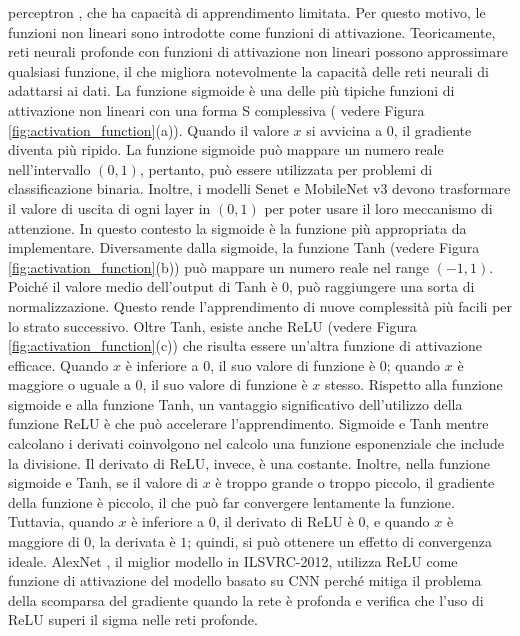 perceptron \cite{rosenblatt1958perceptron, rosenblatt1961principles}, che ha capacità di apprendimento limitata. 
Per questo motivo, le funzioni non lineari sono introdotte come funzioni di attivazione. Teoricamente, reti 
neurali profonde con funzioni di attivazione non lineari possono approssimare qualsiasi funzione, il che 
migliora notevolmente la capacità delle reti neurali di adattarsi ai dati.
La funzione sigmoide è una delle più tipiche funzioni di attivazione non lineari con una forma S complessiva (
vedere Figura \ref{fig:activation_function}(a)). 
Quando il valore $x$ si avvicina a $0$, il gradiente diventa più ripido. La funzione sigmoide può mappare un 
numero reale nell'intervallo $(0, 1)$, pertanto, può essere utilizzata per problemi di classificazione binaria. 
Inoltre, i modelli Senet \cite{hu2018squeeze} e MobileNet v3 \cite{howard2019searching} devono trasformare il 
valore di uscita di ogni layer in $(0, 1)$ per poter usare il loro meccanismo di attenzione. 
In questo contesto la sigmoide è la funzione più appropriata da implementare.
Diversamente dalla sigmoide, la funzione Tanh \cite{726791} (vedere Figura \ref{fig:activation_function}(b)) 
può mappare un numero reale nel range $(-1, 1)$. Poiché il valore medio dell'output di Tanh è $0$, può raggiungere 
una sorta di normalizzazione. Questo rende l'apprendimento di nuove complessità più facili per lo
strato successivo.
Oltre Tanh, esiste anche ReLU \cite{nair2010rectified} (vedere Figura \ref{fig:activation_function}(c)) che 
risulta essere un'altra funzione di attivazione efficace. 
Quando $x$ è inferiore a $0$, il suo valore di funzione è $0$; quando $x$ è maggiore o uguale a $0$, il suo valore 
di funzione è $x$ stesso. 
Rispetto alla funzione sigmoide e alla funzione Tanh, un vantaggio significativo dell'utilizzo della funzione ReLU è che 
può accelerare l'apprendimento. Sigmoide e Tanh mentre calcolano i derivati coinvolgono nel calcolo una funzione
esponenziale che include la divisione.
Il derivato di ReLU, invece, è una costante. Inoltre, nella funzione sigmoide e Tanh, se il valore di $x$ è troppo
grande o troppo piccolo, il gradiente della funzione è piccolo, il che può far convergere lentamente la funzione. 
Tuttavia, quando $x$ è inferiore a $0$, il derivato di ReLU è $0$, e quando $x$ è maggiore di $0$, la derivata è $1$;
quindi, si può ottenere un effetto di convergenza ideale. AlexNet \cite{krizhevsky2017imagenet}, il miglior modello 
in ILSVRC-2012, utilizza ReLU come funzione di attivazione del modello basato su CNN perché mitiga il problema della
scomparsa del gradiente quando la rete è profonda e verifica che l'uso di ReLU superi il sigma nelle reti profonde.

